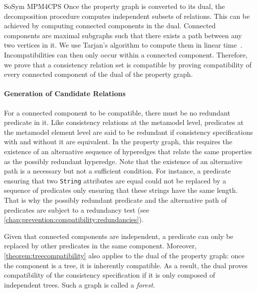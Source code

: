\begin{copiedFrom}{SoSym MPM4CPS}
Once the property graph is converted to its dual, the decomposition procedure computes independent subsets of relations. This can be achieved by computing connected components in the dual. Connected components are maximal subgraphs such that there exists a path between any two vertices in it. We use Tarjan's algorithm to compute them in linear time~\cite{tarjan1972depth}. Incompatibilities can then only occur within a connected component. Therefore, we prove that a consistency relation set is compatible by proving compatibility of every connected component of the dual of the property graph.

\paragraph{Generation of Candidate Relations}
For a connected component to be compatible, there must be no redundant predicate in it. Like consistency relations at the metamodel level, predicates at the metamodel element level are said to be redundant if consistency specifications with and without it are equivalent. In the property graph, this requires the existence of an alternative sequence of hyperedges that relate the same properties as the possibly redundant hyperedge. 
Note that the existence of an alternative path is a necessary but not a sufficient condition. For instance, a predicate ensuring that two \texttt{String} attributes are equal could not be replaced by a sequence of predicates only ensuring that these strings have the same length. That is why the possibly redundant predicate and the alternative path of predicates are subject to a redundancy test (see \autoref{chap:prevention:compatibility:redundancies}).

Given that connected components are independent, a predicate can only be replaced by other predicates in the same component. Moreover, \autoref{theorem:treecompatibility} also applies to the dual of the property graph: once the component is a tree, it is inherently compatible. As a result, the dual proves compatibility of the consistency specification if it is only composed of independent trees. Such a graph is called a \textit{forest}.


\end{copiedFrom}
